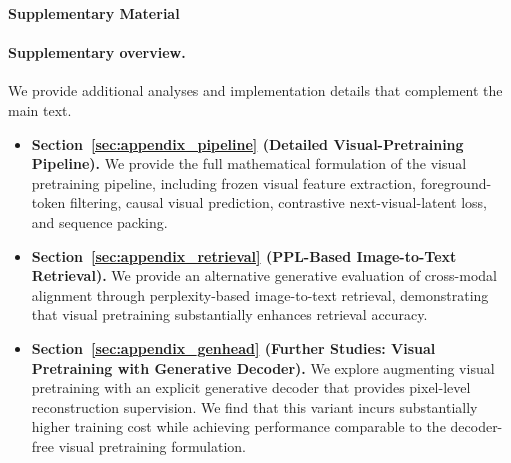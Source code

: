 \clearpage
\newpage
\begin{appendices}
\renewcommand{\appendixname}{}
\makeatletter
\gdef\@seccntformat#1{\csname the#1\endcsname\quad}
\makeatother
\begin{strip}
  \begin{center}
  {\Large\bfseries \papertitle\par}
  \vspace{0.5em}
  {\Large\bfseries Supplementary Material\par}
  \vspace{1.0em}
\end{center}
\end{strip}

\paragraph{Supplementary overview.}
\label{sec:appendix_overview}
We provide additional analyses and implementation details that complement the main text.

\begin{itemize}
  \item \textbf{Section~\ref{sec:appendix_pipeline} (Detailed Visual-Pretraining Pipeline).}
  We provide the full mathematical formulation of the visual pretraining pipeline, including frozen visual feature extraction, foreground-token filtering, causal visual prediction, 
  contrastive next-visual-latent loss, and sequence packing.

  \item \textbf{Section~\ref{sec:appendix_retrieval} (PPL-Based Image-to-Text Retrieval).}
  We provide an alternative generative evaluation of cross-modal alignment through perplexity-based image-to-text retrieval, demonstrating that visual pretraining substantially enhances retrieval accuracy.


  \item \textbf{Section~\ref{sec:appendix_genhead} (Further Studies: Visual Pretraining with Generative Decoder).}
  We explore augmenting visual pretraining with an explicit generative decoder that provides pixel-level reconstruction supervision. We find that this variant incurs substantially higher training cost while achieving performance comparable to the decoder-free visual pretraining formulation.


\end{itemize}
\end{appendices}
